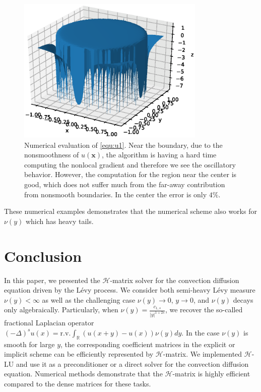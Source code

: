\documentclass[3p,,preprint,12pt]{elsarticle}
\newcommand{\RR}[0]{\mathbb{R}}
\newcommand{\bx}[0]{\mathbf{x}}
\theoremstyle{definition}
\begin{document}
\begin{figure}[H] %
\centering
\includegraphics[width=0.8\textwidth,keepaspectratio]{figures/fig8}
\caption{Numerical evaluation of \cref{equ:u1}. Near the boundary, due to the nonsmoothness of $u(\bx)$, the algorithm is having a hard time computing the nonlocal gradient and therefore we see the oscillatory behavior. However, the computation for the region near the center is  good, which does not suffer much from the far-away contribution from nonsmooth boundaries. In the center the error is only $4\%$.}
\label{fig:fig8}
\end{figure}

These numerical examples demonstrates that the numerical scheme also works for $\nu(y)$ which has heavy tails. 



\section{Conclusion}

In this paper, we presented the $\mathcal{H}$-matrix solver for the convection diffusion equation driven by the L\'evy process. We consider both semi-heavy L\'evy measure $\nu(y)<\infty$ as well as the challenging case $\nu(y)\rightarrow 0$, $y\rightarrow 0$, and $\nu(y)$ decays only algebraically. Particularly, when $\nu(y) = \frac{c_{1,s}}{|y|^{1+2s}}$, we recover the so-called fractional Laplacian operator $(-\Delta)^s u(x) =\mathrm{r.v.} \int_{\RR} (u(x+y)-u(x))\nu(y)dy$. In the case $\nu(y)$ is smooth for large $y$, the corresponding coefficient matrices in the explicit or implicit scheme can be efficiently represented by $\mathcal{H}$-matrix. We implemented $\mathcal{H}$-LU and use it as a preconditioner or a direct solver for the convection diffusion equation. Numerical methods demonstrate that the $\mathcal{H}$-matrix is highly efficient compared to the dense matrices for these tasks. 
\end{document}
